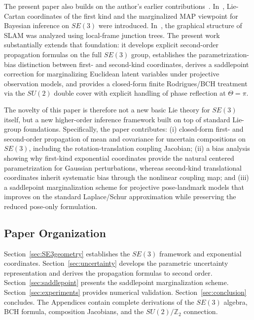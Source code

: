 \documentclass[journal]{IEEEtran}
\begin{document}
The present paper also builds on the author's earlier
contributions~\cite{kuehnel2004,kuehnel2005,kuehnel2008}.
In~\cite{kuehnel2004}, Lie-Cartan coordinates of the first kind
and the marginalized MAP viewpoint for Bayesian inference on
$SE(3)$ were introduced. In~\cite{kuehnel2005}, the graphical
structure of SLAM was analyzed using local-frame junction
trees. The present work substantially extends that foundation:
it develops explicit second-order propagation formulas on the
full $SE(3)$ group, establishes the parametrization-bias
distinction between first- and second-kind coordinates,
derives a saddlepoint correction for marginalizing Euclidean
latent variables under projective observation models, and
provides a closed-form finite Rodrigues/BCH treatment via
the $SU(2)$ double cover with explicit handling of phase
reflection at $\Theta=\pi$.

The novelty of this paper is therefore not a new basic Lie
theory for $SE(3)$ itself, but a new higher-order inference
framework built on top of standard Lie-group foundations.
Specifically, the paper contributes:
(i) closed-form first- and second-order propagation of mean
and covariance for uncertain compositions on $SE(3)$,
including the rotation-translation coupling Jacobian;
(ii) a bias analysis showing why first-kind exponential
coordinates provide the natural centered parametrization for
Gaussian perturbations, whereas second-kind translational
coordinates inherit systematic bias through the nonlinear
coupling map; and
(iii) a saddlepoint marginalization scheme for projective
pose-landmark models that improves on the standard
Laplace/Schur approximation while preserving the reduced
pose-only formulation.

\subsection{Paper Organization}

Section~\ref{sec:SE3geometry} establishes the $SE(3)$ 
framework and exponential coordinates. 
Section~\ref{sec:uncertainty} develops the parametric 
uncertainty representation and derives the propagation 
formulas to second order. 
Section~\ref{sec:saddlepoint} presents the saddlepoint 
marginalization scheme. 
Section~\ref{sec:experiments} provides numerical validation.
Section~\ref{sec:conclusion} concludes. 
The Appendices contain complete derivations of the $SE(3)$ 
algebra, BCH formula, composition Jacobians, and the 
$SU(2)/\mathbb{Z}_2$ connection.

\end{document}
